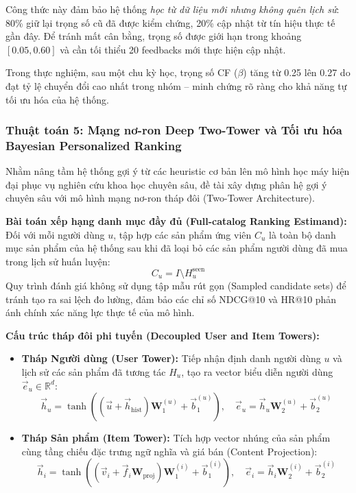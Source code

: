 \documentclass[12pt,a4paper]{report}
\begin{document}
Công thức này đảm bảo hệ thống \textit{học từ dữ liệu mới nhưng không quên lịch sử}: 80\% giữ lại trọng số cũ đã được kiểm chứng, 20\% cập nhật từ tín hiệu thực tế gần đây. Để tránh mất cân bằng, trọng số được giới hạn trong khoảng $[0.05, 0.60]$ và cần tối thiểu 20 feedbacks mới thực hiện cập nhật.
 
Trong thực nghiệm, sau một chu kỳ học, trọng số CF ($\beta$) tăng từ 0.25 lên 0.27 do đạt tỷ lệ chuyển đổi cao nhất trong nhóm -- minh chứng rõ ràng cho khả năng tự tối ưu hóa của hệ thống.

\subsubsection{Thuật toán 5: Mạng nơ-ron Deep Two-Tower và Tối ưu hóa Bayesian Personalized Ranking}
Nhằm nâng tầm hệ thống gợi ý từ các heuristic cơ bản lên mô hình học máy hiện đại phục vụ nghiên cứu khoa học chuyên sâu, đề tài xây dựng phân hệ gợi ý chuyên sâu với mô hình mạng nơ-ron tháp đôi (Two-Tower Architecture).

\textbf{Bài toán xếp hạng danh mục đầy đủ (Full-catalog Ranking Estimand):}
Đối với mỗi người dùng $u$, tập hợp các sản phẩm ứng viên $C_u$ là toàn bộ danh mục sản phẩm của hệ thống sau khi đã loại bỏ các sản phẩm người dùng đã mua trong lịch sử huấn luyện:
\begin{equation}
    C_u = I \setminus H_u^{\text{seen}}
\end{equation}
Quy trình đánh giá không sử dụng tập mẫu rút gọn (Sampled candidate sets) để tránh tạo ra sai lệch đo lường, đảm bảo các chỉ số NDCG@10 và HR@10 phản ánh chính xác năng lực thực tế của mô hình.

\textbf{Cấu trúc tháp đôi phi tuyến (Decoupled User and Item Towers):}
\begin{itemize}
    \item \textbf{Tháp Người dùng (User Tower):} Tiếp nhận định danh người dùng $u$ và lịch sử các sản phẩm đã tương tác $H_u$, tạo ra vector biểu diễn người dùng $\vec{e}_u \in \mathbb{R}^d$:
    \begin{equation}
        \vec{h}_u = \tanh \left( (\vec{u} + \vec{h}_{\text{hist}}) \mathbf{W}_1^{(u)} + \vec{b}_1^{(u)} \right), \quad \vec{e}_u = \vec{h}_u \mathbf{W}_2^{(u)} + \vec{b}_2^{(u)}
    \end{equation}
    \item \textbf{Tháp Sản phẩm (Item Tower):} Tích hợp vector nhúng của sản phẩm cùng tầng chiếu đặc trưng ngữ nghĩa và giá bán (Content Projection):
    \begin{equation}
        \vec{h}_i = \tanh \left( (\vec{v}_i + \vec{f}_i \mathbf{W}_{\text{proj}}) \mathbf{W}_1^{(i)} + \vec{b}_1^{(i)} \right), \quad \vec{e}_i = \vec{h}_i \mathbf{W}_2^{(i)} + \vec{b}_2^{(i)}
    \end{equation}
\end{itemize}
\end{document}
